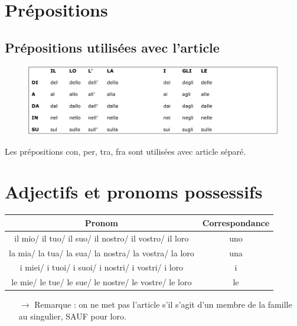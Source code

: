 \documentclass[12pt, openany]{report}
\begin{document}
\section{Prépositions}
\subsection{Prépositions utilisées avec l'article}
\begin{figure}[H]
    \centering
    \includegraphics[width = \textwidth]{img/prep.png}
\end{figure}
Les prépositions con, per, tra, fra sont utilisées avec article séparé. 
\section{Adjectifs et pronoms possessifs}
\begin{center}
    \begin{tabular}{c|c}
        Pronom & Correspondance\\ \hline
        il mio/ il tuo/ il suo/ il nostro/ il vostro/ il loro & uno \\
        la mia/ la tua/ la sua/ la nostra/ la vostra/ la loro & una\\
        i miei/ i tuoi/ i suoi/ i nostri/ i vostri/ i loro & i\\
        le mie/ le tue/ le sue/ le nostre/ le vostre/ le loro & le\\
    \end{tabular}
\end{center}
\begin{itemize}
    \item [$\rightarrow$] Remarque : on ne met pas l'article s'il s'agit d'un membre de la famille au singulier, SAUF pour loro. 
\end{itemize}
\end{document}
